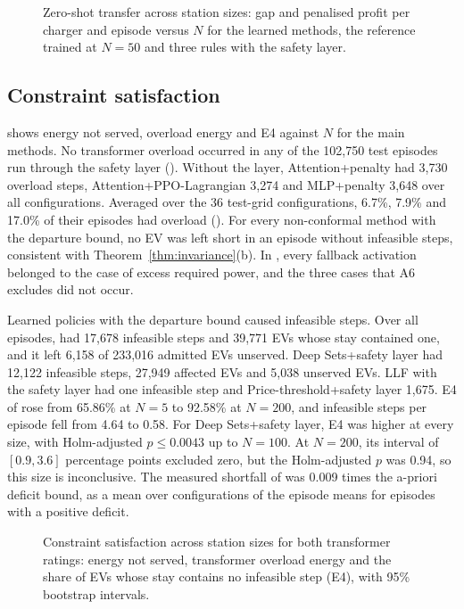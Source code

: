 \begin{figure}[t]
\centering
{}
\caption{Zero-shot transfer across station sizes: gap and penalised profit per charger and episode versus $N$ for the learned methods, the reference trained at $N=50$ and three rules with the safety layer.}
\label{fig:zeroshot}
\end{figure}

\subsection{Constraint satisfaction}\label{sec:res-constraints}

 shows energy not served, overload energy and E4 against $N$ for the main methods.
No transformer overload occurred in any of the 102,750 test episodes run through the safety layer ().
Without the layer, Attention+penalty had 3,730 overload steps, Attention+PPO-Lagrangian 3,274 and MLP+penalty 3,648 over all configurations.
Averaged over the 36 test-grid configurations, 6.7\%, 7.9\% and 17.0\% of their episodes had overload ().
For every non-conformal method with the departure bound, no EV was left short in an episode without infeasible steps, consistent with Theorem~\ref{thm:invariance}(b).
In , every fallback activation belonged to the case of excess required power, and the three cases that A6 excludes did not occur.

Learned policies with the departure bound caused infeasible steps.
Over all episodes, \method{} had 17,678 infeasible steps and 39,771 EVs whose stay contained one, and it left 6,158 of 233,016 admitted EVs unserved.
Deep Sets+safety layer had 12,122 infeasible steps, 27,949 affected EVs and 5,038 unserved EVs.
LLF with the safety layer had one infeasible step and Price-threshold+safety layer 1,675.
E4 of \method{} rose from 65.86\% at $N=5$ to 92.58\% at $N=200$, and infeasible steps per episode fell from 4.64 to 0.58.
For Deep Sets+safety layer, E4 was higher at every size, with Holm-adjusted $p\le0.0043$ up to $N=100$.
At $N=200$, its interval of $[0.9,3.6]$ percentage points excluded zero, but the Holm-adjusted $p$ was 0.94, so this size is inconclusive.
The measured shortfall of \method{} was 0.009 times the a-priori deficit bound, as a mean over configurations of the episode means for episodes with a positive deficit.

\begin{figure}[t]
\centering
{}
\caption{Constraint satisfaction across station sizes for both transformer ratings: energy not served, transformer overload energy and the share of EVs whose stay contains no infeasible step (E4), with 95\% bootstrap intervals.}
\label{fig:constraints}
\end{figure}

